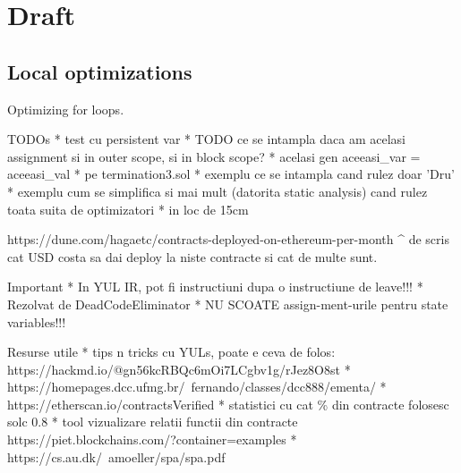 \chapter*{Draft} 

\section{Local optimizations}
Optimizing for loops.



















TODOs
* test cu persistent var
* TODO ce se intampla daca am acelasi assignment si in outer scope, si in block scope?
* acelasi gen aceeasi_var = aceeasi_val
* pe termination3.sol
  * exemplu ce se intampla cand rulez doar 'Dru'
  * exemplu cum se simplifica si mai mult (datorita static analysis) cand rulez toata suita de optimizatori
* \textwidth in loc de 15cm


  https://dune.com/hagaetc/contracts-deployed-on-ethereum-per-month
  ^ de scris cat USD costa sa dai deploy la niste contracte si cat de multe sunt.


Important
* In YUL IR, pot fi instructiuni dupa o instructiune de leave!!!
  * Rezolvat de DeadCodeEliminator
* NU SCOATE assign-ment-urile pentru state variables!!!


Resurse utile
* tips n tricks cu YULs, poate e ceva de folos: https://hackmd.io/@gn56kcRBQc6mOi7LCgbv1g/rJez8O8st
* https://homepages.dcc.ufmg.br/~fernando/classes/dcc888/ementa/
* https://etherscan.io/contractsVerified
  * statistici cu cat \% din contracte folosesc solc 0.8
* tool vizualizare relatii functii din contracte https://piet.blockchains.com/?container=examples%
* https://cs.au.dk/~amoeller/spa/spa.pdf


